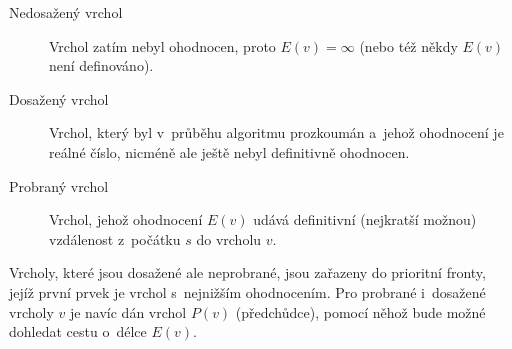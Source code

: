 \begin{description}
	\item[Nedosažený vrchol] Vrchol zatím nebyl ohodnocen, proto $E(v) = \infty$ (nebo též někdy $E(v)$ není definováno).
	\item[Dosažený vrchol] Vrchol, který byl v~průběhu algoritmu prozkoumán a~jehož ohodnocení je reálné číslo, nicméně ale ještě nebyl definitivně ohodnocen.
	\item[Probraný vrchol] Vrchol, jehož ohodnocení $E(v)$ udává definitivní (nejkratší možnou) vzdálenost z~počátku $s$ do vrcholu $v$. 
\end{description}

Vrcholy, které jsou dosažené ale neprobrané, jsou zařazeny do prioritní fronty, jejíž první prvek je vrchol s~nejnižším ohodnocením. Pro probrané i~dosažené vrcholy $v$ je navíc dán vrchol $P(v)$ (předchůdce), pomocí něhož bude možné dohledat cestu o~délce $E(v)$.

